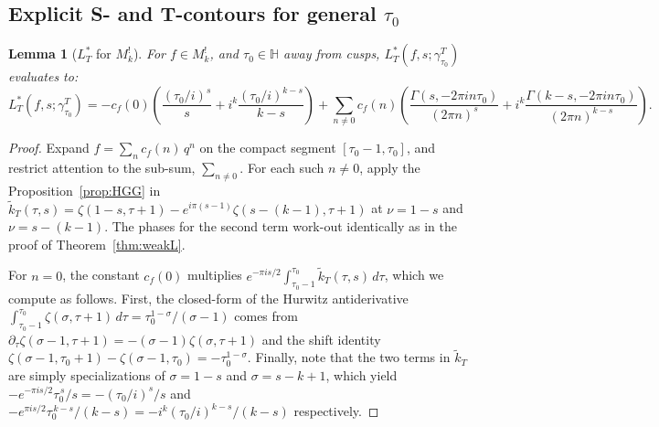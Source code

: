 \documentclass[11pt]{article}
\newtheorem{lemma}[theorem]{Lemma}
\newcommand{\HH}{\mathbb{H}}
\newcommand{\tk}{\widetilde{k}_T}
\begin{document}
\subsection{Explicit S- and T-contours for general $\tau_0$}

\begin{lemma}[$L^*_T$ for $M^!_k$]\label{lem:Tclosed-Mk}
For $f\in M^!_k$, and $\tau_0 \in \HH$ away from cusps, 
$L^*_T(f, s; \gamma^T_{\tau_0})$ evaluates to:
\begin{equation}\label{eq:T-segment-closed-Mk}
L_T^*(f, s; \gamma^T_{\tau_0})
= -c_f(0)\!\left(\frac{(\tau_0/i)^{s}}{s} + i^k\frac{(\tau_0/i)^{k-s}}{k-s}\right) + \sum_{n \ne 0}\! c_f(n)\!\left(\frac{\Gamma(s, -2\pi i n\tau_0)}{(2\pi n)^s} + i^k\frac{\Gamma(k - s, -2\pi i n\tau_0)}{(2\pi n)^{k-s}}\right).
\end{equation}
\end{lemma}
\begin{proof}
Expand $f = \sum_n c_f(n)\,q^n$ on the compact segment
$[\tau_0 - 1, \tau_0]$, and restrict attention to the sub-sum, $\sum_{n \neq 0}$. 
For each such $n \neq 0$, apply the Proposition~\ref{prop:HGG} in
$\widetilde{k}_T(\tau, s) = \zeta(1 - s, \tau + 1) - e^{i\pi(s-1)}\zeta(s - (k-1), \tau + 1)$
at $\nu = 1 - s$ and $\nu = s - (k - 1)$. The phases for the second term work-out 
identically as in the proof of Theorem~\ref{thm:weakL}.  

For $n = 0$, the constant $c_f(0)$ multiplies $e^{-\pi i s/2}\!\int_{\tau_0 - 1}^{\tau_0}\!\widetilde k_T(\tau, s)\,d\tau$, 
which we compute as follows. First, the closed-form of the Hurwitz antiderivative 
$\int_{\tau_0 - 1}^{\tau_0}\zeta(\sigma, \tau + 1)\,d\tau = \tau_0^{1 - \sigma}/(\sigma - 1)$
comes from $\partial_\tau\zeta(\sigma - 1, \tau + 1) = -(\sigma - 1)\zeta(\sigma, \tau + 1)$ 
and the shift identity $\zeta(\sigma - 1, \tau_0 + 1) - \zeta(\sigma - 1, \tau_0) = -\tau_0^{1 - \sigma}$. 
Finally, note that the two terms in $\tk$ are simply specializations of $\sigma = 1 - s$ and $\sigma = s - k + 1$, 
which yield $-e^{-\pi i s/2}\tau_0^{\,s}/s = -(\tau_0/i)^s/s$ and 
$-e^{\pi i s/2}\tau_0^{\,k-s}/(k-s) = -i^k(\tau_0/i)^{k-s}/(k-s)$ respectively.
\end{proof}
\end{document}
